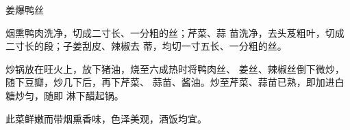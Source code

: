 \begin{recipe}{姜爆鸭丝}

\ingredients



\cooking

\step 烟熏鸭肉洗净，切成二寸长、一分粗的丝；芹菜、蒜 苗洗净，去头芨粗叶，切成二寸长的段；子姜刮皮、辣椒去 蒂，均切一寸五长、一分粗的丝。

\step 炒锅放在旺火上，放下猪油，烧至六成热时将鸭肉丝、 姜丝、辣椒丝倒下微炒，随下豆瓣，炒几下后，再下芹菜、 蒜苗、酱油。炒至芹菜、蒜苗已熟，即加进白糖炒匀，随即 淋下醋起锅。

\notes

此菜鲜嫩而带烟熏香味，色泽美观，酒饭均宜。

\end{recipe}

